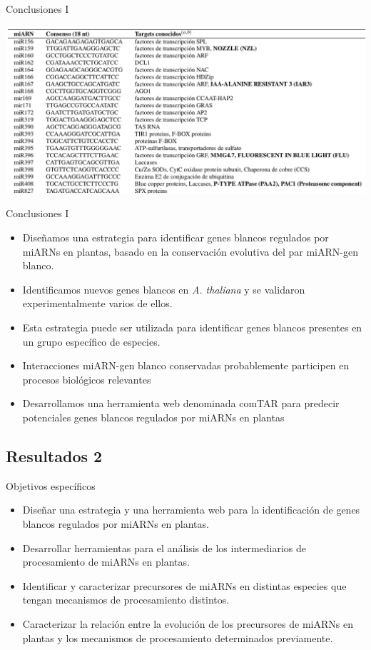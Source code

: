 \documentclass{beamer}
\begin{document}
\begin{frame}{Conclusiones I}
	\begin{center}
		\includegraphics[width=.8\textwidth]{img/miRNAs_y_genes_blancos.png}
	\end{center}
\end{frame}

\begin{frame}{Conclusiones I}
	\begin{itemize}
        \item<1-> Diseñamos una estrategia para identificar genes blancos regulados por miARNs en plantas, basado en la conservación evolutiva del par miARN-gen blanco.
        \item<2-> Identificamos nuevos genes blancos en \textit{A. thaliana} y se validaron experimentalmente varios de ellos.
        \item<3-> Esta estrategia puede ser utilizada para identificar genes blancos presentes en un grupo específico de especies.
        \item<4-> Interacciones miARN-gen blanco conservadas probablemente participen en procesos biológicos relevantes
        \item<5-> Desarrollamos una herramienta web denominada comTAR para predecir potenciales genes blancos regulados por miARNs en plantas
	\end{itemize}
\end{frame}


\subsection{Resultados 2}

\begin{frame}{Objetivos específicos}
		\pause
		\begin{itemize}
            \item<-1> Diseñar una estrategia y una herramienta web para la identificación de genes blancos regulados por miARNs en plantas.
			\item<-2> Desarrollar herramientas para el análisis de los intermediarios de procesamiento de miARNs en plantas.
			\item<-2> Identificar y caracterizar precursores de miARNs en distintas especies que tengan mecanismos de procesamiento distintos.
			\item<-1> Caracterizar la relación entre la evolución de los precursores de miARNs en plantas y los mecanismos de procesamiento determinados previamente.
        \end{itemize}
\end{frame}
\end{document}
